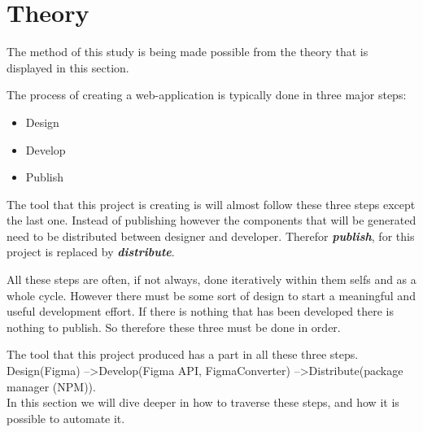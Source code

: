 \section{Theory}

The method of this study is being made possible from the theory that is displayed in this section. 






The process of creating a web-application is typically done in three major steps: 
\begin{itemize}
  \item Design
  \item Develop
  \item Publish
\end{itemize}

The tool that this project is creating is will almost follow these three steps except the last one. Instead of publishing however the components that will be generated need to be distributed between designer and developer. Therefor \textbf{\textit{publish}}, for this project is replaced by \textbf{\textit{distribute}}.

All these steps are often, if not always, done iteratively within them selfs and as a whole cycle. However there must be some sort of design to start a meaningful and useful development effort. If there is nothing that has been developed there is nothing to publish. So therefore these three must be done in order. 

The tool that this project produced has a part in all these three steps.\\ 
Design(Figma) --\textgreater Develop(Figma API, FigmaConverter) --\textgreater Distribute(package manager (NPM)).\\
In this section we will dive deeper in how to traverse these steps, and how it is possible to automate it.

